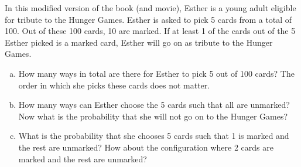 \documentclass[]{article}
\newif\ifsolutions
\renewcommand{\answer}[1]{{\color{mydarkblue}\textbf{Solution:}#1}}
\begin{document}
\begin{qunlist}
In this modified version of the book (and movie), Esther is a young adult eligible for tribute to the Hunger Games. Esther is asked to pick 5 cards from a total of 100. Out of these 100 cards, 10 are marked. If at least 1 of the cards out of the 5 Esther picked is a marked card, Esther will go on as tribute to the Hunger Games. 

\begin{enumerate}[a)]
  \qpart
\item How many ways in total are there for Esther to pick 5 out of 100 cards? The order in which she picks these cards does not matter. 

\ifsolutions{ \answer {
$\binom{100}{5}$. Again, we read this answer aloud as "$100$ choose $5$." This is equivalent to $\frac{100*99*98*97*96}{5!} = \frac{100!}{5!(100-5)!}$. We can see this derived since we have $100$ choices for the first card, and the second card can be anything but the first card, so we have $99$ choices for the second card, and so on. We have to divide by $5!$ since every combination of $5$ cards has $5!$ permutations. In other words, there are $5!$ to arrange each set of $5$ cards, so we are over counting by a factor of $5!$ Thus, we must divide $10*9*8*7*6$ by $5!$. In the future, you can read this answer and immediately see it as a form of "$n$ choose $k$" and can write $\binom{100}{5}$ immediately.

}}\fi
  
  \qpart
\item How many ways can Esther choose the 5 cards such that all are unmarked? Now what is the probability that she will not go on to the Hunger Games? 

\ifsolutions{ \answer {
To answer the first question, we count all the ways to pick $5$ cards from all the unmarked cards. According to the question there are $90$ unmarked cards. Therefore there are $\binom{90}{5}$ ways to pick all unmarked cards and thus $\binom{90}{5}$ ways to avoid going on the Hunger games. We use the rule that since each outcome is equally likely, to calculate the probability she will not go to the hunger games we count the outcomes in which she will not go to the hunger games ($\binom{90}{5}$) and divide by the total number of outcomes ($\binom{100}{5}$). Therefore our answer is $\frac{\binom{90}{5}}{\binom{100}{5}} \approx 0.58$
}} \fi
  
  \qpart
\item What is the probability that she chooses 5 cards such that 1 is marked and the rest are unmarked? How about the configuration where 2 cards are marked and the rest are unmarked? 
  

\end{enumerate}
\end{qunlist}
\end{document}
